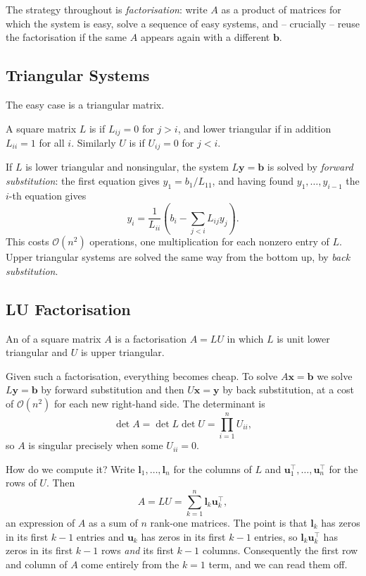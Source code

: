 \documentclass[a4paper]{scrartcl}
\begin{document}
The strategy throughout is \emph{factorisation}: write $A$ as a product of matrices for which the system is easy, solve a sequence of easy systems, and -- crucially -- reuse the factorisation if the same $A$ appears again with a different $\mathbf{b}$.

\subsection{Triangular Systems}

The easy case is a triangular matrix.

\begin{definition}
  A square matrix $L$ is  if $L_{ij} = 0$ for $j > i$, and  lower triangular if in addition $L_{ii} = 1$ for all $i$. Similarly $U$ is  if $U_{ij} = 0$ for $j < i$.
\end{definition}

If $L$ is lower triangular and nonsingular, the system $L\mathbf{y} = \mathbf{b}$ is solved by \emph{forward substitution}: the first equation gives $y_1 = b_1/L_{11}$, and having found $y_1, \dots, y_{i-1}$ the $i$-th equation gives
$$
y_i = \frac{1}{L_{ii}}\left(b_i - \sum_{j<i}L_{ij}y_j\right).
$$
This costs $\mathcal{O}(n^2)$ operations, one multiplication for each nonzero entry of $L$. Upper triangular systems are solved the same way from the bottom up, by \emph{back substitution}.

\subsection{LU Factorisation}

\begin{definition}[LU Factorisation]
  An  of a square matrix $A$ is a factorisation $A = LU$ in which $L$ is unit lower triangular and $U$ is upper triangular.
\end{definition}

Given such a factorisation, everything becomes cheap. To solve $A\mathbf{x} = \mathbf{b}$ we solve $L\mathbf{y} = \mathbf{b}$ by forward substitution and then $U\mathbf{x} = \mathbf{y}$ by back substitution, at a cost of $\mathcal{O}(n^2)$ for each new right-hand side. The determinant is
$$
\det A = \det L \det U = \prod_{i=1}^n U_{ii},
$$
so $A$ is singular precisely when some $U_{ii} = 0$.

How do we compute it? Write $\mathbf{l}_1, \dots, \mathbf{l}_n$ for the columns of $L$ and $\mathbf{u}_1^\top, \dots, \mathbf{u}_n^\top$ for the rows of $U$. Then
$$
A = LU = \sum_{k=1}^{n}\mathbf{l}_k \mathbf{u}_k^\top,
$$
an expression of $A$ as a sum of $n$ rank-one matrices. The point is that $\mathbf{l}_k$ has zeros in its first $k-1$ entries and $\mathbf{u}_k$ has zeros in its first $k-1$ entries, so $\mathbf{l}_k\mathbf{u}_k^\top$ has zeros in its first $k-1$ rows \emph{and} its first $k-1$ columns. Consequently the first row and column of $A$ come entirely from the $k=1$ term, and we can read them off.
\end{document}
